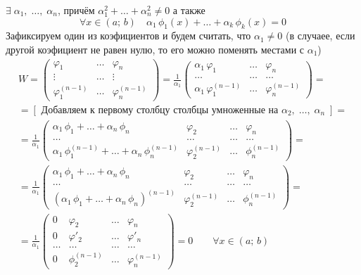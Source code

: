 \begin{Proof}
    $\exists \; \alpha_1,\;\dots,\;\alpha_n$, причём $\alpha_1^2 + \dots + \alpha^2_n \neq 0$ а также
    \[
        \forall x \in(a;\,b) \quad \alpha_1\,\phi_1(x)+\dots+\alpha_k\,\phi_k(x)=0
    \]
    Зафиксируем один из коэфициентов и будем считать, что $\alpha_1 \neq 0$ (в случаее, если другой коэфициент не равен нулю, то его можно поменять местами с $\alpha_1$)
    \begin{gather*}
        W = 
        \begin{pmatrix} 
            \varphi_1 & \dots &\varphi_n \\ 
            \vdots & \dots & \vdots\\ 
            \varphi_1^{(n-1)} & \dots & \varphi_n^{(n-1)} 
        \end{pmatrix}
        = \frac{1}{\alpha_1}
        \begin{pmatrix}
            \alpha_1\,\varphi_1 & \dots & \varphi_n \\ 
            \dots & \dots & \dots\\ 
            \alpha_1\,\varphi_1^{(n-1)} & \dots & \varphi_n^{(n-1)} 
        \end{pmatrix} 
        =\\
        = [\text{ Добавляем к первому столбцу столбцы умноженные на }\alpha_2,\; \dots,\; \alpha_n \;] =\\
        =\frac{1}{\alpha_1}
        \begin{pmatrix} 
            \alpha_1\,\phi_1 + \dots + \alpha_n\,\phi_n & \varphi_2 & \dots &\varphi_n \\ 
            \dots & \dots & \dots & \dots\\
            \alpha_1\,\phi_1^{(n-1)}+\dots+\alpha_n\,\phi_n^{(n-1)} & \varphi_2^{(n - 1)} &\dots &\phi_n^{(n-1)} 
        \end{pmatrix} 
        =\\
        =\frac{1}{\alpha_1}
        \begin{pmatrix} 
            \alpha_1\,\phi_1 + \dots + \alpha_n\,\phi_n & \varphi_2 & \dots &\varphi_n \\ 
            \dots & \dots & \dots & \dots\\
            (\alpha_1\,\phi_1 + \dots + \alpha_n\,\phi_n)^{(n-1)} & \varphi_2^{(n - 1)} &\dots &\phi_n^{(n-1)} 
        \end{pmatrix} 
        =\\
        =\frac{1}{\alpha_1}
        \begin{pmatrix} 
            0 & \varphi_2 & \dots & \varphi_n \\
            0 & \varphi'_2 & \dots & \varphi'_n \\ 
            \dots & \dots & \dots & \dots \\ 
            0 & \phi_2^{(n-1)} & \dots & \varphi_n^{(n-1)} 
        \end{pmatrix}
        = 0 \qquad \forall x \in (a;\,b)
    \end{gather*}
\end{Proof}


